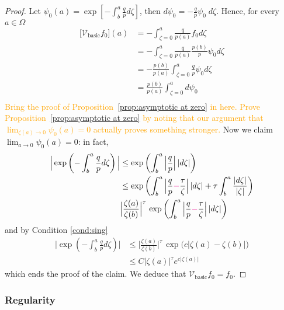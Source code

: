\documentclass{article}
\theoremstyle{plain}
\newcommand{\hardpart}{\mathcal{V}_\text{basic}}
\begin{document}
\begin{proof}
    Let $\psi_0(a)= \exp\left[-\int_{b}^{a}\frac{q}{p} d\zeta\right]$, then $ d \psi_0 = -\frac{q}{p} \psi_0\;d\zeta $. Hence, for every $a\in\Omega$ 
    \begin{align*}
        \big[\hardpart f_0\big](a) &= - \int_{\zeta=0}^{a} \frac{q}{p(a)} f_0 d\zeta \\
        &= - \int_{\zeta=0}^{a} \frac{q}{p(a)} \frac{p(b)}{p}\psi_0 d\zeta \\
        &= - \frac{p(b)}{p(a)}  \int_{\zeta=0}^{a} \frac{q}{p} \psi_0 d\zeta\\
        &= \frac{p(b)}{p(a)}  \int_{\zeta=0}^{a} d\psi_0  \\
    \end{align*}
    \textcolor{orange}{Bring the proof of Proposition~\ref{prop:asymptotic at zero} in here. Prove Proposition~\ref{prop:asymptotic at zero} by noting that our argument that $\lim_{\zeta(a) \to 0} \psi_0(a) = 0$ actually proves something stronger.}
    \color{RoyalBlue}
    Now we claim $\lim_{a\to 0}\psi_0(a)=0$: in fact,
    \begin{align*}
        \Big\vert \exp\left(-\int_b^a\frac{q}{p}d\zeta\right) \Big\vert&\leq \exp\left(\int_b^a \Big\vert\frac{q}{p}\Big \vert\, |d\zeta|\right)\\
        &\leq \exp\left(\int_b^a \Big\vert\frac{q}{p}\textcolor{magenta}{-}\frac{\tau}{\zeta}\Big \vert\, |d\zeta| + \tau \int_b^a\frac{|d\zeta|}{|\zeta|} \right)\\
        &\Big\vert \frac{\zeta(a)}{\zeta(b)}\Big\vert^{\tau} \, \exp\left(\int_b^a \Big\vert\frac{q}{p}\textcolor{magenta}{-}\frac{\tau}{\zeta}\Big \vert\, |d\zeta|  \right)
    \end{align*}
    and by Condition \eqref{cond:sing}
\begin{align*}
     \Big\vert \exp\left(-\int_b^a\frac{q}{p}d\zeta\right) \Big\vert& \leq \Big\vert \frac{\zeta(a)}{\zeta(b)}\Big\vert^{\tau} \, \exp\Big(c |\zeta(a)-\zeta(b)|\Big)\\
     &\leq C |\zeta(a)|^\tau e^{c|\zeta(a)|}
\end{align*}
 which ends the proof of the claim.\color{black} We deduce that $\hardpart  f_0=f_0$. 
\end{proof}


\subsubsection{Regularity}\label{sec:asymptotics}
\end{document}
